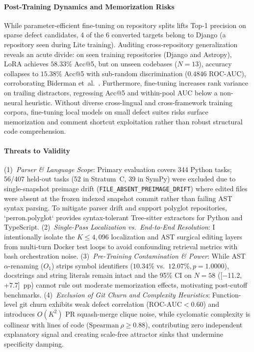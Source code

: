\documentclass[10pt]{article}
\begin{document}
\paragraph{Post-Training Dynamics and Memorization Risks}
While parameter-efficient fine-tuning on repository splits lifts Top-1 precision on sparse defect candidates, 4 of the 6 converted targets belong to Django (a repository seen during Lite training). Auditing cross-repository generalization reveals an acute divide: on seen training repositories (Django and Astropy), LoRA achieves $58.33\%$ Acc@5, but on unseen codebases ($N=13$), accuracy collapses to $15.38\%$ Acc@5 with sub-random discrimination ($0.4846$ ROC-AUC), corroborating Biderman et~al.~\cite{biderman2024lora}. Furthermore, fine-tuning increases rank variance on trailing distractors, regressing Acc@5 and within-pool AUC below a non-neural heuristic. Without diverse cross-lingual and cross-framework training corpora, fine-tuning local models on small defect suites risks surface memorization and comment shortcut exploitation rather than robust structural code comprehension.
\paragraph{Threats to Validity}
(1)~\textit{Parser \& Language Scope}: Primary evaluation covers 344 Python tasks; 56/407 held-out tasks (52 in Stratum~C, 39 in SymPy) were excluded due to single-snapshot preimage drift (\texttt{FILE\_ABSENT\_PREIMAGE\_DRIFT}) where edited files were absent at the frozen indexed snapshot commit rather than failing AST syntax parsing. To mitigate parser drift and support polyglot repositories, `perron.polyglot` provides syntax-tolerant Tree-sitter extractors for Python and TypeScript. (2)~\textit{Single-Pass Localization vs.\ End-to-End Resolution}: I intentionally isolate the $K \le 4,096$ localization and AST surgical editing layers from multi-turn Docker test loops to avoid confounding retrieval metrics with bash orchestration noise. (3)~\textit{Pre-Training Contamination \& Power}: While AST $\alpha$-renaming ($O_1$) strips symbol identifiers ($10.34\%$ vs.\ $12.07\%, p=1.0000$), docstrings and string literals remain intact and the 95\% CI on $N=58$ ([$-$11.2, +7.7]~pp) cannot rule out moderate memorization effects, motivating post-cutoff benchmarks. (4)~\textit{Exclusion of Git Churn and Complexity Heuristics}: Function-level git churn exhibits weak defect correlation ($\text{ROC-AUC} < 0.60$) and introduces $O(K^2)$ PR squash-merge clique noise, while cyclomatic complexity is collinear with lines of code ($\text{Spearman}~\rho \ge 0.88$), contributing zero independent explanatory signal and creating scale-free attractor sinks that undermine specificity damping.
\end{document}
